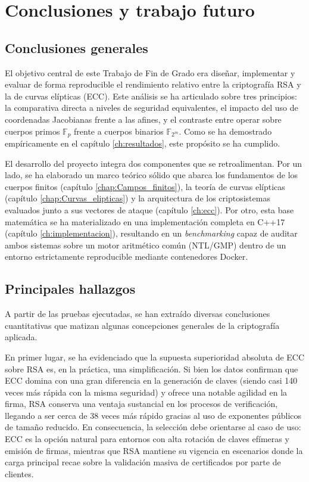 %

\chapter{Conclusiones y trabajo futuro}
\label{ch:conclusiones}

\section{Conclusiones generales}
\label{sec:conc-generales}

El objetivo central de este Trabajo de Fin de Grado era diseñar, implementar y evaluar de forma reproducible el rendimiento relativo entre la criptografía RSA y la de curvas elípticas (ECC). Este análisis se ha articulado sobre tres principios: la comparativa directa a niveles de seguridad equivalentes, el impacto del uso de coordenadas Jacobianas frente a las afines, y el contraste entre operar sobre cuerpos primos $\mathbb{F}_p$ frente a cuerpos binarios $\mathbb{F}_{2^m}$. Como se ha demostrado empíricamente en el capítulo \ref{ch:resultados}, este propósito se ha cumplido.

El desarrollo del proyecto integra dos componentes que se retroalimentan. Por un lado, se ha elaborado un marco teórico sólido que abarca los fundamentos de los cuerpos finitos (capítulo \ref{chap:Campos_finitos}), la teoría de curvas elípticas (capítulo \ref{chap:Curvas_elipticas}) y la arquitectura de los criptosistemas evaluados junto a sus vectores de ataque (capítulo \ref{ch:ecc}). Por otro, esta base matemática se ha materializado en una implementación completa en C++17 (capítulo \ref{ch:implementacion}), resultando en un \textit{benchmarking} capaz de auditar ambos sistemas sobre un motor aritmético común (NTL/GMP) dentro de un entorno estrictamente reproducible mediante contenedores Docker.

\section{Principales hallazgos}
\label{sec:conc-hallazgos}

A partir de las pruebas ejecutadas, se han extraído diversas conclusiones cuantitativas que matizan algunas concepciones generales de la criptografía aplicada.

En primer lugar, se ha evidenciado que la supuesta superioridad absoluta de ECC sobre RSA es, en la práctica, una simplificación. Si bien los datos confirman que ECC domina 
con una gran diferencia en la generación de claves (siendo casi 140 veces más rápida con la misma seguridad) y ofrece una notable agilidad en la firma, RSA conserva una ventaja 
sustancial en los procesos de verificación, llegando a ser cerca de 38 veces más rápido gracias al uso de exponentes públicos de tamaño reducido. En consecuencia, la selección 
debe orientarse al caso de uso: ECC es la opción natural para entornos con alta rotación de claves efímeras y emisión de firmas, mientras que RSA mantiene su vigencia en escenarios 
donde la carga principal recae sobre la validación masiva de certificados por parte de clientes.

